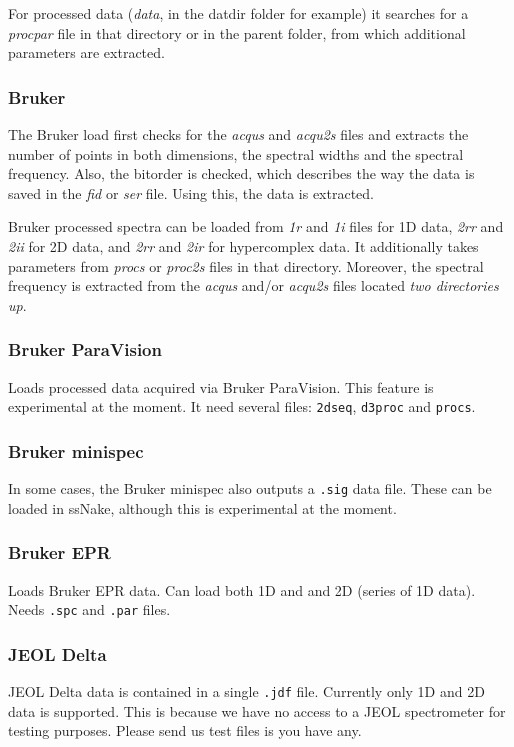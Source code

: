 \documentclass[11pt,a4paper]{article}
\begin{document}
For processed data (\textit{data}, in the datdir folder for example) it searches for a \textit{procpar} file in that directory or in the parent folder, from which additional parameters are extracted.

\subsubsection*{Bruker}
The Bruker load first checks for the \textit{acqus} and \textit{acqu2s} files and extracts the number of points in both dimensions, the spectral widths and the spectral frequency. Also, the bitorder is checked, which describes the way the data is saved in the \textit{fid} or \textit{ser} file. Using this, the data is extracted.

Bruker processed spectra can be loaded from \textit{1r} and \textit{1i} files for 1D data, \textit{2rr} and \textit{2ii} for 2D data, and \textit{2rr} and \textit{2ir} for hypercomplex data. It additionally takes parameters from \textit{procs} or \textit{proc2s} files in that directory. Moreover, the spectral frequency is extracted from the \textit{acqus} and/or \textit{acqu2s} files located \textit{two directories up}.

\subsubsection*{Bruker ParaVision}
Loads processed data acquired via Bruker ParaVision. This feature is experimental at the moment. It need several files: \texttt{2dseq}, \texttt{d3proc} and \texttt{procs}.

\subsubsection*{Bruker minispec}
In some cases, the Bruker minispec also outputs a \texttt{.sig} data file. These can be loaded in ssNake, although this is experimental at the moment.

\subsubsection*{Bruker EPR}
Loads Bruker EPR data. Can load both 1D and and 2D (series of 1D data). Needs \texttt{.spc} and \texttt{.par} files.

\subsubsection*{JEOL Delta}
JEOL Delta data is contained in a single \texttt{.jdf} file. Currently only 1D and 2D data is
 supported. This is because we have no access to a JEOL spectrometer for testing
purposes. Please send us test files is you have any.
\end{document}
